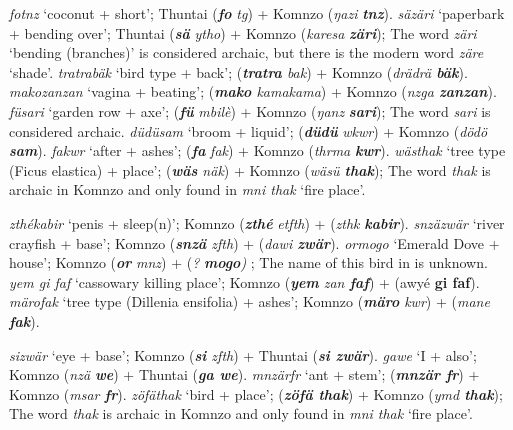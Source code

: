 \begin{exe}
\ex
\label{ex656}
\begin{xlist}
	\ex \emph{fotnz} `coconut + short';  Thuntai (\emph{\textbf{fo}} \emph{tg}) + Komnzo (\emph{ŋazi} \emph{\textbf{tnz}}).
	\ex \emph{säzäri} `paperbark + bending over';  Thuntai (\emph{\textbf{sä}} \emph{ytho}) + Komnzo (\emph{karesa} \emph{\textbf{zäri}}); The word \emph{zäri} `bending (branches)' is considered archaic, but there is the modern word \emph{zäre} `shade'.
	\ex \emph{tratrabäk} `bird type + back';  (\emph{\textbf{tratra} bak}) + Komnzo (\emph{drädrä \textbf{bäk}}).
	\ex \emph{makozanzan} `vagina + beating';  (\emph{\textbf{mako} kamakama}) + Komnzo (\emph{nzga \textbf{zanzan}}).
	\ex \emph{füsari} `garden row + axe';  (\emph{\textbf{fü}} \emph{mbilè}) + Komnzo (\emph{ŋanz} \emph{\textbf{sari}}); The word \emph{sari} is considered archaic.
	\ex \emph{düdüsam} `broom + liquid';  (\emph{\textbf{düdü}} \emph{wkwr}) + Komnzo (\emph{dödö} \emph{\textbf{sam}}).
	\ex \emph{fakwr} `after + ashes';  (\emph{\textbf{fa}} \emph{fak}) + Komnzo (\emph{thrma} \emph{\textbf{kwr}}).
	\ex \emph{wästhak} `tree type (Ficus elastica) + place';  (\emph{\textbf{wäs} näk}) + Komnzo (\emph{wäsü \textbf{thak}}); The word \emph{thak} is archaic in Komnzo and only found in \emph{mni thak} `fire place'.\label{ex659}
\end{xlist}
\end{exe}%
\begin{exe}
\ex
\label{ex657}
\begin{xlist}
	\ex \emph{zthékabir} `penis + sleep(n)'; Komnzo (\emph{\textbf{zthé}} \emph{etfth}) +  (\emph{zthk} \emph{\textbf{kabir}}).
	\ex \emph{snzäzwär} `river crayfish + base'; Komnzo (\emph{\textbf{snzä} zfth}) +  (\emph{dawi \textbf{zwär}}).\label{ex660}
	\ex \emph{ormogo} `Emerald Dove + house'; Komnzo (\emph{\textbf{or}} \emph{mnz}) +  (\emph{?} \emph{\textbf{mogo})} ; The name of this bird in  is unknown.
	\ex \emph{yem gi faf} `cassowary killing place'; Komnzo (\emph{\textbf{yem} zan \textbf{faf}}) +  (awyé \textbf{gi faf}).
	\ex \emph{märofak} `tree type (Dillenia ensifolia) + ashes'; Komnzo (\emph{\textbf{märo} kwr}) +  (\emph{mane \textbf{fak}}).
\end{xlist}
\end{exe}%
\begin{exe}
\ex
\label{ex658}
\begin{xlist}
	\ex \emph{sizwär} `eye + base'; Komnzo (\emph{\textbf{si} zfth}) +  Thuntai (\emph{\textbf{si zwär}}).
	\ex \emph{gawe} `I + also'; Komnzo (\emph{nzä \textbf{we}}) +  Thuntai (\emph{\textbf{ga we}}).
	\ex \emph{mnzärfr} `ant + stem';  (\emph{\textbf{mnzär fr}}) + Komnzo (\emph{msar \textbf{fr}}).
	\ex \emph{zöfäthak} `bird + place';  (\emph{\textbf{zöfä thak}}) + Komnzo (\emph{ymd \textbf{thak}}); The word \emph{thak} is archaic in Komnzo and only found in \emph{mni thak} `fire place'.
\end{xlist}
\end{exe}%

